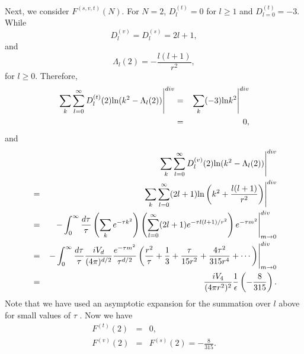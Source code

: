 \documentclass[a4paper,aps,preprint,groupedaddress,showpacs]{revtex4}
\begin{document}
Next, we consider $F^{(s,v,t)}(N)$. For $N=2$, $D^{(t)}_{l}=0$ for
$l\geq 1$ and $D^{(t)}_{l=0}=-3$. While
\begin{equation}
D^{(v)}_{l}=D^{(s)}_{l}=2l+1,
\end{equation}
and
\begin{equation}
\Lambda_{l}(2)=-\frac{l(l+1)}{r^{2}},
\end{equation}
for $l\geq 0$. Therefore,
\begin{eqnarray}
\left.\sum_{k}\sum^{\infty}_{l=0}D^{(t)}_{l}(2){\rm ln}
(k^{2}-\Lambda_{l}(2))\right\vert^{div} 
&=&\left.\sum_{k}(-3){\rm ln}k^{2}\right\vert^{div}
\nonumber\\
&=&0,
\end{eqnarray}
and 
\begin{eqnarray}
&&\left.\sum_{k}\sum^{\infty}_{l=0}D^{(v)}_{l}(2)
{\rm ln}(k^{2}-\Lambda_{l}(2))\right\vert^{div}
\nonumber\\
&=&\left.\sum_{k}\sum^{\infty}_{l=0}(2l+1){\rm ln}
\left(k^{2}+\frac{l(l+1)}{r^{2}}\right)\right\vert^{div}
\nonumber\\
&=&\left.-\int^{\infty}_{0}\frac{d\tau}{\tau}
\left(\sum_{k}e^{-\tau k^{2}}\right)
\left(\sum^{\infty}_{l=0}(2l+1)e^{-\tau l(l+1)/r^{2}}\right)
e^{-\tau m^{2}}\right\vert^{div}_{m\rightarrow 0}
\nonumber\\
&=&\left.-\int^{\infty}_{0}\frac{d\tau}{\tau}
\frac{iV_{d}}{(4\pi)^{d/2}}
\frac{e^{-\tau m^{2}}}{\tau^{d/2}}
\left(\frac{r^{2}}{\tau}+\frac{1}{3}+
\frac{\tau}{15r^{2}}+\frac{4\tau^{2}}{315r^{4}}+\cdots\right)
\right\vert^{div}_{m\rightarrow 0}
\nonumber\\
&=&\frac{iV_{4}}{(4\pi r^{2})^{2}}\frac{1}{\epsilon}
\left(-\frac{8}{315}\right).
\end{eqnarray}
Note that we have used an asymptotic expansion for the summation
over $l$ above for small values of $\tau$ \cite{BKM}.
Now we have
\begin{eqnarray}
F^{(t)}(2)&=&0,
\\
F^{(v)}(2)&=&F^{(s)}(2)=-\frac{8}{315}.
\end{eqnarray}
\end{document}

